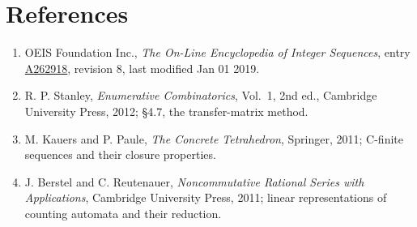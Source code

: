 \documentclass[11pt]{article}
\theoremstyle{definition}
\begin{document}
\section{References}

\begin{enumerate}

\item OEIS Foundation Inc., \emph{The On-Line Encyclopedia of Integer Sequences}, entry \href{https://oeis.org/A262918}{A262918}, revision 8, last modified Jan 01 2019.

\item R. P. Stanley, \emph{Enumerative Combinatorics}, Vol.~1, 2nd ed., Cambridge University Press, 2012; \S4.7, the transfer-matrix method.

\item M. Kauers and P. Paule, \emph{The Concrete Tetrahedron}, Springer, 2011; C-finite sequences and their closure properties.

\item J. Berstel and C. Reutenauer, \emph{Noncommutative Rational Series with Applications}, Cambridge University Press, 2011; linear representations of counting automata and their reduction.

\end{enumerate}
\end{document}
